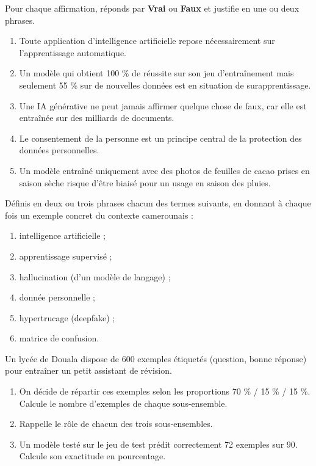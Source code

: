 \documentclass[11pt]{article}
\begin{document}
\begin{exercice}
Pour chaque affirmation, réponds par \textbf{Vrai} ou \textbf{Faux} et justifie en une ou deux phrases.
\begin{enumerate}
\item Toute application d'intelligence artificielle repose nécessairement sur l'apprentissage automatique.
\item Un modèle qui obtient 100 \% de réussite sur son jeu d'entraînement mais seulement 55 \% sur de nouvelles données est en situation de surapprentissage.
\item Une IA générative ne peut jamais affirmer quelque chose de faux, car elle est entraînée sur des milliards de documents.
\item Le consentement de la personne est un principe central de la protection des données personnelles.
\item Un modèle entraîné uniquement avec des photos de feuilles de cacao prises en saison sèche risque d'être biaisé pour un usage en saison des pluies.
\end{enumerate}
\end{exercice}

\begin{exercice}
Définis en deux ou trois phrases chacun des termes suivants, en donnant à chaque fois un exemple concret du contexte camerounais :
\begin{enumerate}
\item intelligence artificielle ;
\item apprentissage supervisé ;
\item hallucination (d'un modèle de langage) ;
\item donnée personnelle ;
\item hypertrucage (deepfake) ;
\item matrice de confusion.
\end{enumerate}
\end{exercice}

\begin{exercice}
Un lycée de Douala dispose de 600 exemples étiquetés (question, bonne réponse) pour entraîner un petit assistant de révision.
\begin{enumerate}
\item On décide de répartir ces exemples selon les proportions 70 \% / 15 \% / 15 \%. Calcule le nombre d'exemples de chaque sous-ensemble.
\item Rappelle le rôle de chacun des trois sous-ensembles.
\item Un modèle testé sur le jeu de test prédit correctement 72 exemples sur 90. Calcule son exactitude en pourcentage.
\end{enumerate}
\end{exercice}
\end{document}
